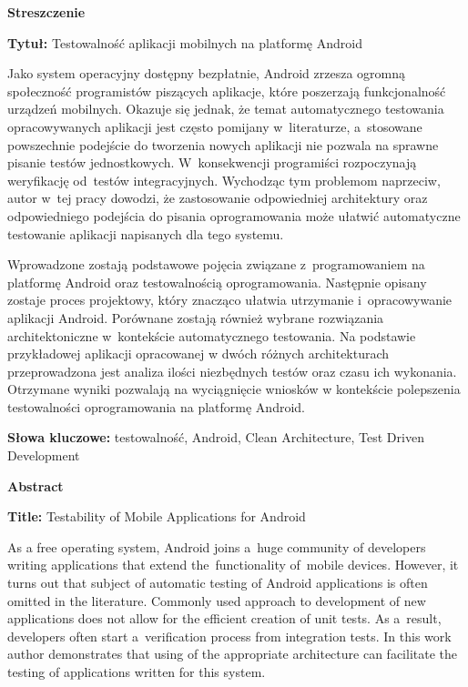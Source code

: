 
\begin{center}
\Large{\textbf{Streszczenie}}
\end{center}

\textbf{Tytuł:} Testowalność aplikacji mobilnych na platformę Android
\vspace{7 pt}

Jako system operacyjny dostępny bezpłatnie, Android zrzesza ogromną społeczność programistów piszących aplikacje, które poszerzają funkcjonalność urządzeń mobilnych. Okazuje się jednak, że temat automatycznego testowania opracowywanych aplikacji jest często pomijany w~literaturze, a~stosowane powszechnie podejście do tworzenia nowych aplikacji nie pozwala na sprawne pisanie testów jednostkowych. W~konsekwencji programiści rozpoczynają weryfikację od~testów integracyjnych. Wychodząc tym problemom naprzeciw, autor w~tej pracy dowodzi, że zastosowanie odpowiedniej architektury oraz odpowiedniego podejścia do pisania oprogramowania może ułatwić automatyczne testowanie aplikacji napisanych dla tego systemu.  

Wprowadzone zostają podstawowe pojęcia związane z~programowaniem na platformę Android oraz testowalnością oprogramowania. Następnie opisany zostaje proces projektowy, który znacząco ułatwia utrzymanie i~opracowywanie aplikacji Android. Porównane zostają również wybrane rozwiązania architektoniczne w~kontekście automatycznego testowania. Na podstawie przykładowej aplikacji opracowanej w dwóch różnych architekturach przeprowadzona jest analiza ilości niezbędnych testów oraz czasu ich wykonania. Otrzymane wyniki pozwalają na wyciągnięcie wniosków w kontekście polepszenia testowalności oprogramowania na platformę Android.
\vspace{7 pt}

\textbf{Słowa kluczowe:} testowalność, Android, Clean Architecture, Test Driven Development

\begin{center}
\Large{\textbf{Abstract}}
\end{center}

\textbf{Title:} Testability of Mobile Applications for Android
\vspace{7 pt}

As a free operating system, Android joins a~huge community of developers writing applications that extend the~functionality of~mobile devices. However, it turns out that subject of automatic testing of Android applications is often omitted in the literature. Commonly used approach to development of new applications does not allow for the efficient creation of unit tests. As a~result, developers often start a~verification process from integration tests. In this work author demonstrates that using of the appropriate architecture can facilitate the testing of applications written for this system.

